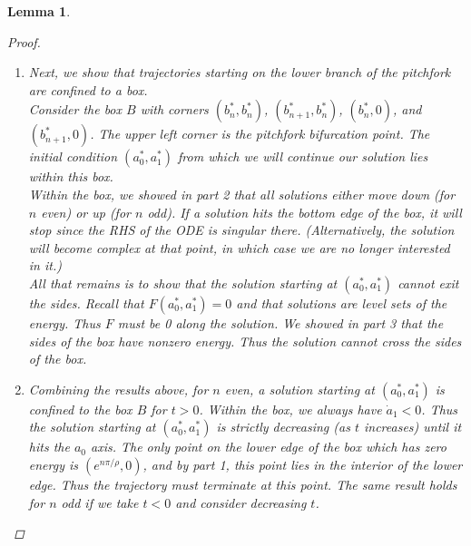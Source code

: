 \documentclass[12pt]{article}
\newtheorem{lemma}{Lemma}
\begin{document}
\begin{lemma}
\begin{proof}
\begin{enumerate}
\item Next, we show that trajectories starting on the lower branch of the pitchfork are confined to a box.\\ 

Consider the box $B$ with corners $(b^*_n, b^*_n)$, $(b^*_{n+1}, b^*_n)$, $(b^*_n, 0)$, and $(b^*_{n+1}, 0)$. The upper left corner is the pitchfork bifurcation point. The initial condition $(a_0^*, a_1^*)$ from which we will continue our solution lies within this box.\\

Within the box, we showed in part 2 that all solutions either move down (for $n$ even) or up (for $n$ odd). If a solution hits the bottom edge of the box, it will stop since the RHS of the ODE is singular there. (Alternatively, the solution will become complex at that point, in which case we are no longer interested in it.)\\

All that remains is to show that the solution starting at $(a_0^*, a_1^*)$ cannot exit the sides. Recall that $F(a_0^*, a_1^*) = 0$ and that solutions are level sets of the energy. Thus $F$ must be 0 along the solution. We showed in part 3 that the sides of the box have nonzero energy. Thus the solution cannot cross the sides of the box.

\item Combining the results above, for $n$ even, a solution starting at $(a_0^*, a_1^*)$ is confined to the box $B$ for $t > 0$. Within the box, we always have $\dot a_1 < 0$. Thus the solution starting at $(a_0^*, a_1^*)$ is strictly decreasing (as $t$ increases) until it hits the $a_0$ axis. The only point on the lower edge of the box which has zero energy is $(e^{n \pi/\rho}, 0)$, and by part 1, this point lies in the interior of the lower edge. Thus the trajectory must terminate at this point. The same result holds for $n$ odd if we take $t < 0$ and consider decreasing $t$.

\end{enumerate}

\end{proof}
\end{lemma}





\end{document}
